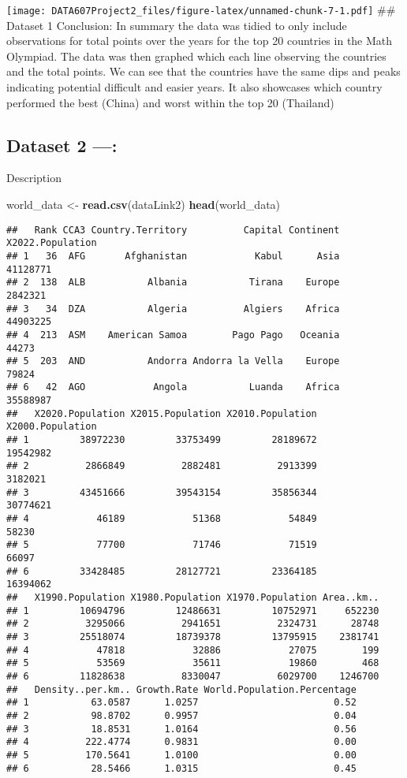 \documentclass[
]{article}
\newenvironment{Shaded}{\begin{snugshade}}{\end{snugshade}}
\newcommand{\FunctionTok}[1]{\textcolor[rgb]{0.13,0.29,0.53}{\textbf{#1}}}
\newcommand{\NormalTok}[1]{#1}
\newcommand{\OtherTok}[1]{\textcolor[rgb]{0.56,0.35,0.01}{#1}}
\begin{document}
\texttt{[image: DATA607Project2\_files/figure-latex/unnamed-chunk-7-1.pdf]}
\#\# Dataset 1 Conclusion: In summary the data was tidied to only
include observations for total points over the years for the top 20
countries in the Math Olympiad. The data was then graphed which each
line observing the countries and the total points. We can see that the
countries have the same dips and peaks indicating potential difficult
and easier years. It also showcases which country performed the best
(China) and worst within the top 20 (Thailand)

\subsection{Dataset 2 ---:}\label{dataset-2}

Description

\begin{Shaded}
\begin{Highlighting}[]
\NormalTok{world\_data }\OtherTok{\textless{}{-}} \FunctionTok{read.csv}\NormalTok{(dataLink2)}
\FunctionTok{head}\NormalTok{(world\_data)}
\end{Highlighting}
\end{Shaded}

\begin{verbatim}
##   Rank CCA3 Country.Territory          Capital Continent X2022.Population
## 1   36  AFG       Afghanistan            Kabul      Asia         41128771
## 2  138  ALB           Albania           Tirana    Europe          2842321
## 3   34  DZA           Algeria          Algiers    Africa         44903225
## 4  213  ASM    American Samoa        Pago Pago   Oceania            44273
## 5  203  AND           Andorra Andorra la Vella    Europe            79824
## 6   42  AGO            Angola           Luanda    Africa         35588987
##   X2020.Population X2015.Population X2010.Population X2000.Population
## 1         38972230         33753499         28189672         19542982
## 2          2866849          2882481          2913399          3182021
## 3         43451666         39543154         35856344         30774621
## 4            46189            51368            54849            58230
## 5            77700            71746            71519            66097
## 6         33428485         28127721         23364185         16394062
##   X1990.Population X1980.Population X1970.Population Area..km..
## 1         10694796         12486631         10752971     652230
## 2          3295066          2941651          2324731      28748
## 3         25518074         18739378         13795915    2381741
## 4            47818            32886            27075        199
## 5            53569            35611            19860        468
## 6         11828638          8330047          6029700    1246700
##   Density..per.km.. Growth.Rate World.Population.Percentage
## 1           63.0587      1.0257                        0.52
## 2           98.8702      0.9957                        0.04
## 3           18.8531      1.0164                        0.56
## 4          222.4774      0.9831                        0.00
## 5          170.5641      1.0100                        0.00
## 6           28.5466      1.0315                        0.45
\end{verbatim}
\end{document}
